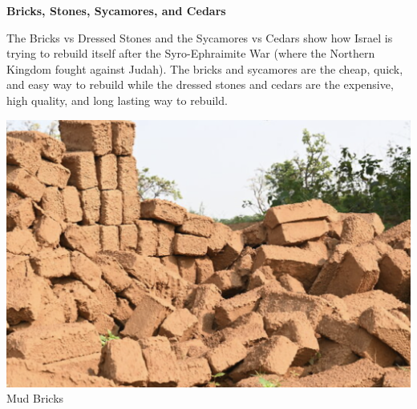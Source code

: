 \documentclass[11pt]{article}
\begin{document}
\vspace{3em}
{\large\bfseries Bricks, Stones, Sycamores, and Cedars}
\vspace{1em}

The Bricks vs Dressed Stones and the Sycamores vs Cedars show how Israel is trying to rebuild itself after the Syro-Ephraimite War (where the Northern Kingdom fought against Judah). The bricks and sycamores are the cheap, quick, and easy way to rebuild while the dressed stones and cedars are the expensive, high quality, and long lasting way to rebuild. 

\begin{center}
\begin{minipage}[t]{0.45\textwidth}
\centering
\includegraphics[width=\textwidth]{mud-bricks.png}\\
\vspace{0.5em}
Mud Bricks
\end{minipage}
\hspace{0.05\textwidth}
\begin{minipage}[t]{0.45\textwidth}
\centering

\end{minipage}
\end{center}
\end{document}
